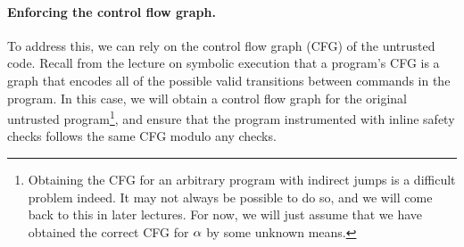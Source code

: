 \documentclass[11pt,twoside]{scrartcl}
\begin{document}
\paragraph{Enforcing the control flow graph.} To address this, we can rely on the control flow graph (CFG) of the untrusted code. Recall from the lecture on symbolic execution that a program's CFG is a graph that encodes all of the possible valid transitions between commands in the program. In this case, we will obtain a control flow graph for the original untrusted program\footnote{Obtaining the CFG for an arbitrary program with indirect jumps is a difficult problem indeed. It may not always be possible to do so, and we will come back to this in later lectures. For now, we will just assume that we have obtained the correct CFG for $\alpha$ by some unknown means.}, and ensure that the program instrumented with inline safety checks follows the same CFG modulo any checks.
\end{document}
